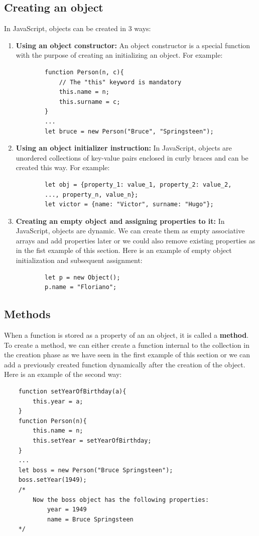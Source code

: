 \documentclass{scrbook}
\begin{document}
\subsection{Creating an object}

In JavaScript, objects can be created in 3 ways:
\begin{enumerate}
    \item
    \textbf{Using an object constructor:} An object constructor is a special function with the purpose of creating an initializing an object. For example:
    \begin{lstlisting}
        function Person(n, c){
            // The "this" keyword is mandatory
            this.name = n;
            this.surname = c;
        }
        ...
        let bruce = new Person("Bruce", "Springsteen");
    \end{lstlisting}

    \item
    \textbf{Using an object initializer instruction:} In JavaScript, objects are unordered collections of key-value pairs enclosed in curly braces and can be created this way. For example:
    \begin{lstlisting}
        let obj = {property_1: value_1, property_2: value_2,
        ..., property_n, value_n};
        let victor = {name: "Victor", surname: "Hugo"};
    \end{lstlisting}

    \item
    \textbf{Creating an empty object and assigning properties to it:} In JavaScript, objects are dynamic. We can create them as empty associative arrays and add properties later or we could also remove existing properties as in the fist example of this section. Here is an example of empty object initialization and subsequent assignment:
    \begin{lstlisting}
        let p = new Object();
        p.name = "Floriano";
    \end{lstlisting}
\end{enumerate}

\subsection{Methods}

When a function is stored as a property of an an object, it is called a \textbf{method}. To create a method, we can either create a function internal to the collection in the creation phase as we have seen in the first example of this section or we can add a previously created function dynamically after the creation of the object. Here is an example of the second way:
\begin{lstlisting}
    function setYearOfBirthday(a){
        this.year = a;
    }
    function Person(n){
        this.name = n;
        this.setYear = setYearOfBirthday;
    }
    ...
    let boss = new Person("Bruce Springsteen");
    boss.setYear(1949);
    /*
        Now the boss object has the following properties:
            year = 1949
            name = Bruce Springsteen
    */
\end{lstlisting}
\end{document}
